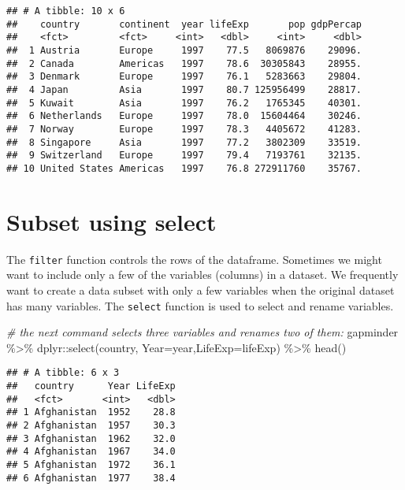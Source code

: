 \documentclass[
]{book}
\newenvironment{Shaded}{\begin{snugshade}}{\end{snugshade}}
\newcommand{\AttributeTok}[1]{\textcolor[rgb]{0.77,0.63,0.00}{#1}}
\newcommand{\CommentTok}[1]{\textcolor[rgb]{0.56,0.35,0.01}{\textit{#1}}}
\newcommand{\FunctionTok}[1]{\textcolor[rgb]{0.00,0.00,0.00}{#1}}
\newcommand{\NormalTok}[1]{#1}
\newcommand{\SpecialCharTok}[1]{\textcolor[rgb]{0.00,0.00,0.00}{#1}}
\begin{document}
\begin{verbatim}
## # A tibble: 10 x 6
##    country       continent  year lifeExp       pop gdpPercap
##    <fct>         <fct>     <int>   <dbl>     <int>     <dbl>
##  1 Austria       Europe     1997    77.5   8069876    29096.
##  2 Canada        Americas   1997    78.6  30305843    28955.
##  3 Denmark       Europe     1997    76.1   5283663    29804.
##  4 Japan         Asia       1997    80.7 125956499    28817.
##  5 Kuwait        Asia       1997    76.2   1765345    40301.
##  6 Netherlands   Europe     1997    78.0  15604464    30246.
##  7 Norway        Europe     1997    78.3   4405672    41283.
##  8 Singapore     Asia       1997    77.2   3802309    33519.
##  9 Switzerland   Europe     1997    79.4   7193761    32135.
## 10 United States Americas   1997    76.8 272911760    35767.
\end{verbatim}

\hypertarget{subset-using-select}{%
\section{Subset using select}\label{subset-using-select}}

The \texttt{filter} function controls the rows of the dataframe. Sometimes we might want to include only a few of the variables (columns) in a dataset. We frequently want to create a data subset with only a few variables when the original dataset has many variables. The \texttt{select} function is used to select and rename variables.

\begin{Shaded}
\begin{Highlighting}[]
\CommentTok{\# the next command selects three variables and renames two of them:}
\NormalTok{gapminder }\SpecialCharTok{\%\textgreater{}\%} 
\NormalTok{  dplyr}\SpecialCharTok{::}\FunctionTok{select}\NormalTok{(country, }\AttributeTok{Year=}\NormalTok{year,}\AttributeTok{LifeExp=}\NormalTok{lifeExp) }\SpecialCharTok{\%\textgreater{}\%} 
  \FunctionTok{head}\NormalTok{()}
\end{Highlighting}
\end{Shaded}

\begin{verbatim}
## # A tibble: 6 x 3
##   country      Year LifeExp
##   <fct>       <int>   <dbl>
## 1 Afghanistan  1952    28.8
## 2 Afghanistan  1957    30.3
## 3 Afghanistan  1962    32.0
## 4 Afghanistan  1967    34.0
## 5 Afghanistan  1972    36.1
## 6 Afghanistan  1977    38.4
\end{verbatim}
\end{document}
